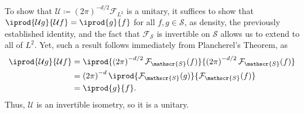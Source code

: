 \documentclass[10pt]{mypackage}
\renewcommand{\coloneq}{\coloneqq}
\begin{document}
\begin{solution}
  To show that $ \mathcal{U}\coloneq \left( 2\pi \right)^{-d/2}\mathcal{F}_{L^2} $ is a unitary, it suffices to show that $ \iprod{\mathcal{U}g}{\mathcal{U}f} = \iprod{g}{f} $ for all $f,g\in \mathscr{S}$, as density, the previously established identity, and the fact that $\mathcal{F}_{\mathscr{S}}$ is invertible on $\mathscr{S}$ allows us to extend to all of $L^2$. Yet, such a result follows immediately from Plancherel's Theorem, as
  \begin{align*}
    \iprod{\mathcal{U}g}{\mathcal{U}f} &= \iprod{\left( 2\pi \right)^{-d/2}\mathcal{F}_{\mathscr{S}}(f)}{\left( 2\pi \right)^{-d/2}\mathcal{F}_{\mathscr{S}}(f)}\\
                                       &= \left( 2\pi \right)^{-d} \iprod{\mathcal{F}_{\mathscr{S}}(g)}{\mathcal{F}_{\mathscr{S}}(f)}\\
                                       &= \iprod{g}{f}.
  \end{align*}
  Thus, $\mathcal{U}$ is an invertible isometry, so it is a unitary.


\end{solution}
\end{document}
